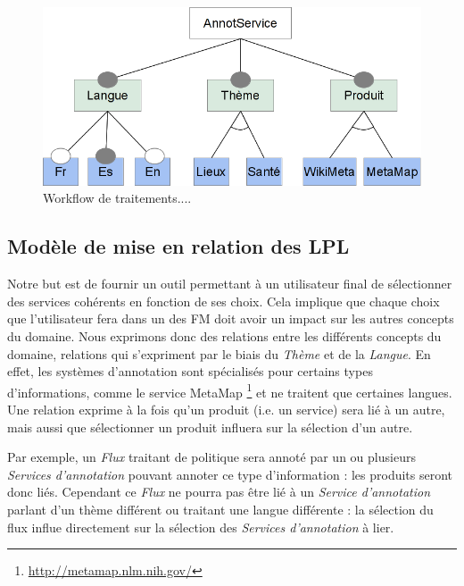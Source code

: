 \documentclass[]{easychair}
\newcommand{\comment}[4]{\par\noindent\hspace*{-0.5cm}{\parbox{\columnwidth}{\textbf{\color{#1}//#2[#3]:#4}}}\par}
\newcommand{\si}[1]{\comment{red}{}{#1}{SI}}
\begin{document}
\begin{figure}[htb!]
	\begin{centering}
	\includegraphics[scale=0.7]{FM.png}
	\caption{Workflow de traitements....}
	\label{fig:mmFM}
	\end{centering}
\end{figure}

\subsection{Modèle de mise en relation des LPL}
Notre but est de fournir un outil permettant à un utilisateur final de sélectionner des services cohérents en fonction de ses choix. Cela implique que chaque choix que l'utilisateur fera dans un des FM doit avoir un impact sur les autres concepts du domaine. 
Nous exprimons donc des relations entre les différents concepts du domaine, relations qui s'expriment par le biais du \textit{Thème} et de la \textit{Langue}. En effet, les systèmes d'annotation sont spécialisés pour certains types d'informations, comme le service MetaMap \footnote{\url{http://metamap.nlm.nih.gov/}} et ne traitent que certaines langues. Une relation exprime à la fois qu'un produit (i.e. un service) sera lié à un autre, mais aussi que sélectionner un produit influera sur la sélection d'un autre.

Par exemple, un \textit{Flux} traitant de politique sera annoté par un ou plusieurs \textit{Services d'annotation} pouvant annoter ce type d'information : les produits seront donc liés. Cependant ce \textit{Flux} ne pourra pas être lié à un \textit{Service d'annotation} parlant d'un thème différent ou traitant une langue différente : la sélection du flux influe directement sur la sélection des \textit{Services d'annotation} à lier.
\end{document}
